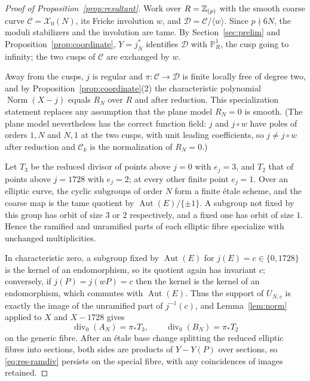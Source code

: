 \documentclass[11pt,a4paper]{article}
\theoremstyle{remark}\newtheorem{remark}[theorem]{Remark}
\numberwithin{equation}{section}
\begin{document}
	\begin{proof}[Proof of Proposition~\ref{prop:resultant}]
		Work over $R=\mathbb Z_{(p)}$ with the smooth coarse curve $\mathcal C=\mathscr X_0(N)$, its Fricke involution $w$, and $\mathcal D=\mathcal C/\langle w\rangle$. Since $p\nmid 6N$, the moduli stabilizers and the involution are tame. By Section~\ref{sec:prelim} and Proposition~\ref{prop:coordinate}, $Y=j_N^*$ identifies $\mathcal D$ with $\mathbb P^1_R$, the cusp going to infinity; the two cusps of $\mathcal C$ are exchanged by $w$.
		
		Away from the cusps, $j$ is regular and $\pi\colon\mathcal C\to\mathcal D$ is finite locally free of degree two, and by Proposition~\ref{prop:coordinate}(2) the characteristic polynomial $\operatorname{Norm}(X-j)$ equals $R_N$ over $R$ and after reduction. This specialization statement replaces any assumption that the plane model $R_N=0$ is smooth. (The plane model nevertheless has the correct function field: $j$ and $j\circ w$ have poles of orders $1,N$ and $N,1$ at the two cusps, with unit leading coefficients, so $j\neq j\circ w$ after reduction and $\mathcal C_k$ is the normalization of $R_N=0$.)
		
		Let $T_3$ be the reduced divisor of points above $j=0$ with $e_j=3$, and $T_2$ that of points above $j=1728$ with $e_j=2$; at every other finite point $e_j=1$. Over an elliptic curve, the cyclic subgroups of order $N$ form a finite \'etale scheme, and the coarse map is the tame quotient by $\operatorname{Aut}(E)/\{\pm1\}$. A subgroup not fixed by this group has orbit of size $3$ or $2$ respectively, and a fixed one has orbit of size $1$. Hence the ramified and unramified parts of each elliptic fibre specialize with unchanged multiplicities.
		
		In characteristic zero, a subgroup fixed by $\operatorname{Aut}(E)$ for $j(E)=c\in\{0,1728\}$ is the kernel of an endomorphism, so its quotient again has invariant $c$; conversely, if $j(P)=j(wP)=c$ then the kernel is the kernel of an endomorphism, which commutes with $\operatorname{Aut}(E)$. Thus the support of $U_{N,c}$ is exactly the image of the unramified part of $j^{-1}(c)$, and Lemma~\ref{lem:norm} applied to $X$ and $X-1728$ gives
		\begin{equation}\label{eq:res-ramdiv}
			\operatorname{div}_0(A_N)=\pi_*T_3,\qquad \operatorname{div}_0(B_N)=\pi_*T_2
		\end{equation}
		on the generic fibre. After an \'etale base change splitting the reduced elliptic fibres into sections, both sides are products of $Y-Y(P)$ over sections, so \eqref{eq:res-ramdiv} persists on the special fibre, with any coincidences of images retained.
		

\end{proof}
\end{document}
